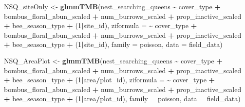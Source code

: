 \documentclass[
]{article}
\newenvironment{Shaded}{\begin{snugshade}}{\end{snugshade}}
\newcommand{\AttributeTok}[1]{\textcolor[rgb]{0.13,0.29,0.53}{#1}}
\newcommand{\DecValTok}[1]{\textcolor[rgb]{0.00,0.00,0.81}{#1}}
\newcommand{\FunctionTok}[1]{\textcolor[rgb]{0.13,0.29,0.53}{\textbf{#1}}}
\newcommand{\NormalTok}[1]{#1}
\newcommand{\OtherTok}[1]{\textcolor[rgb]{0.56,0.35,0.01}{#1}}
\newcommand{\SpecialCharTok}[1]{\textcolor[rgb]{0.81,0.36,0.00}{\textbf{#1}}}
\begin{document}
\begin{Shaded}
\begin{Highlighting}[]
\NormalTok{NSQ\_siteOnly }\OtherTok{\textless{}{-}} \FunctionTok{glmmTMB}\NormalTok{(nest\_searching\_queens }\SpecialCharTok{\textasciitilde{}}\NormalTok{ cover\_type }\SpecialCharTok{+} 
\NormalTok{                        bombus\_floral\_abun\_scaled }\SpecialCharTok{+} 
\NormalTok{                        num\_burrows\_scaled }\SpecialCharTok{+} 
\NormalTok{                        prop\_inactive\_scaled }\SpecialCharTok{+}
\NormalTok{                        bee\_season\_type }\SpecialCharTok{+} 
\NormalTok{                        (}\DecValTok{1}\SpecialCharTok{|}\NormalTok{site\_id),}
                      \AttributeTok{ziformula =} \SpecialCharTok{\textasciitilde{}}\NormalTok{ cover\_type }\SpecialCharTok{+} 
\NormalTok{                        bombus\_floral\_abun\_scaled }\SpecialCharTok{+} 
\NormalTok{                        num\_burrows\_scaled }\SpecialCharTok{+} 
\NormalTok{                        prop\_inactive\_scaled }\SpecialCharTok{+}
\NormalTok{                        bee\_season\_type }\SpecialCharTok{+}
\NormalTok{                        (}\DecValTok{1}\SpecialCharTok{|}\NormalTok{site\_id),}
                      \AttributeTok{family =}\NormalTok{ poisson, }
                      \AttributeTok{data =}\NormalTok{ field\_data)}

\NormalTok{NSQ\_AreaPlot }\OtherTok{\textless{}{-}}  \FunctionTok{glmmTMB}\NormalTok{(nest\_searching\_queens }\SpecialCharTok{\textasciitilde{}}\NormalTok{ cover\_type }\SpecialCharTok{+} 
\NormalTok{                        bombus\_floral\_abun\_scaled }\SpecialCharTok{+} 
\NormalTok{                        num\_burrows\_scaled }\SpecialCharTok{+} 
\NormalTok{                        prop\_inactive\_scaled }\SpecialCharTok{+}
\NormalTok{                        bee\_season\_type }\SpecialCharTok{+} 
\NormalTok{                        (}\DecValTok{1}\SpecialCharTok{|}\NormalTok{area}\SpecialCharTok{/}\NormalTok{plot\_id),}
                      \AttributeTok{ziformula =} \SpecialCharTok{\textasciitilde{}}\NormalTok{ cover\_type }\SpecialCharTok{+} 
\NormalTok{                        bombus\_floral\_abun\_scaled }\SpecialCharTok{+} 
\NormalTok{                        num\_burrows\_scaled }\SpecialCharTok{+} 
\NormalTok{                        prop\_inactive\_scaled }\SpecialCharTok{+}
\NormalTok{                        bee\_season\_type }\SpecialCharTok{+}
\NormalTok{                        (}\DecValTok{1}\SpecialCharTok{|}\NormalTok{area}\SpecialCharTok{/}\NormalTok{plot\_id),}
                      \AttributeTok{family =}\NormalTok{ poisson, }
                      \AttributeTok{data =}\NormalTok{ field\_data)}
\end{Highlighting}
\end{Shaded}
\end{document}
